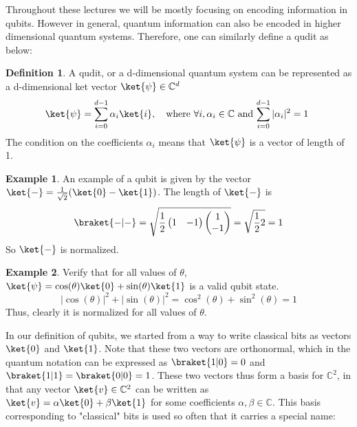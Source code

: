 \documentclass[12pt, oneside]{book}
\theoremstyle{definition}
\newtheorem{definition}{Definition}[section]
\theoremstyle{definition}
\newtheorem{example}{Example}[section]
\theoremstyle{remark}
\begin{document}
Throughout these lectures we will be mostly focusing on encoding information in qubits. However in general, quantum information can also be encoded in higher dimensional quantum systems. Therefore, one can similarly define a qudit as below:
\begin{definition}
    A qudit, or a d-dimensional quantum system can be represented as a d-dimensional ket vector $\ket{\psi} \in \mathbb{C}^d$
    \[
    \ket{\psi}=\sum_{i=0}^{d-1} \alpha_i\ket{i}, \quad \text{where $\forall i, \alpha_i \in \mathbb{C}$ and $\sum_{i=0}^{d-1} |\alpha_i|^2=1$ }
    \]
    The condition on the coefficients $\alpha_i$ means that $\ket{\psi}$ is a vector of length of 1.
\end{definition}
\begin{example}
    An example of a qubit is given by the vector $\ket{-}=\frac{1}{\sqrt{2}}(\ket{0}-\ket{1})$. The length of $\ket{-}$ is
    \[
    \braket{-|-}=\sqrt{\frac{1}{2}\begin{pmatrix} 1 & -1 \end{pmatrix} \begin{pmatrix} 1 \\ -1 \end{pmatrix}}=\sqrt{\frac{1}{2}2}=1
    \]
    So $\ket{-}$ is normalized.
\end{example}
\begin{example}
    Verify that for all values of $\theta$, $\ket{\psi}=\cos (\theta) \ket{0} + \sin (\theta) \ket{1}$ is a valid qubit state.
    \[
    |\cos (\theta)|^2+|\sin (\theta)|^2=\cos^2 (\theta) + \sin^2 (\theta)=1
    \]
    Thus, clearly it is normalized for all values of $\theta$.
\end{example}
In our definition of qubits, we started from a way to write classical bits as vectors $\ket{0}$ and $\ket{1}$. Note that these two vectors are orthonormal, which in the quantum notation can be expressed as $\braket{1|0}=0$ and $\braket{1|1}=\braket{0|0}=1$. These two vectors thus form a basis for $\mathbb{C}^2$, in that any vector $\ket{v}\in \mathbb{C}^2$ can be written as $\ket{v}=\alpha \ket{0} +\beta \ket{1}$ for some coefficients $\alpha,\beta \in \mathbb{C}$. This basis corresponding to "classical" bits is used so often that it carries a special name:
\end{document}
